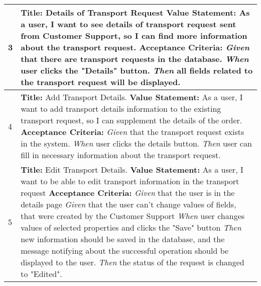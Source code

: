 \documentclass[a4paper]{article}
\begin{document}
\begin{longtable}[c]{|p{0.5cm}||p{}|}
            \\
              \hline
              3 & 
                 \textbf{Title:}  Details of Transport Request  \newline
                 \textbf{Value Statement:} As a user, I want to see details of transport request sent from Customer Support, so I can find more information about the transport request.  \newline
                \textbf{Acceptance Criteria:} \newline
                 \emph{Given} that there are transport requests in the database.\newline 
                 \emph{When} user clicks the "Details" button. \newline
                 \emph{Then} all fields related to the transport request will be displayed. 
               \\
               \hline
              4 & 
                 \textbf{Title:} Add Transport Details.  \newline
                 \textbf{Value Statement:} As a user, I want to add transport details information to the existing transport request, so I can supplement the details of the order. \newline
                \textbf{Acceptance Criteria:} \newline
                 \emph{Given} that the transport request exists in the system. \newline 
                 \emph{When} user clicks the details button. \newline
                 \emph{Then} user can fill in necessary information about the transport request.                \\
             \hline
              5 & 
                 \textbf{Title:} Edit Transport Details.  \newline
                 \textbf{Value Statement:} As a user, I want to be able to edit transport information in the transport request \newline
                \textbf{Acceptance Criteria:} \newline
                 \emph{Given} that the user is in the details page \newline 
                 \emph{Given} that the user can't change values of fields, that were created by the Customer Support \newline 
                 \emph{When} user changes values of selected properties and clicks the "Save" button \newline
                 \emph{Then} new information should be saved in the database, and the message notifying about the successful operation should be displayed to the user. \newline
                 \emph{Then} the status of the request is changed to "Edited".
                 

\end{longtable}
\end{document}
